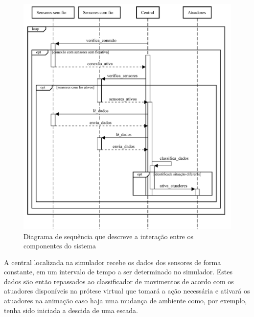 \begin{figure}[ht]
	\caption{\label{fig:sequence_diagram}Diagrama de sequência que descreve a interação entre os componentes do sistema}
	\begin{center}
	    \includegraphics[width=\textwidth]{resources/sequence_diagram.pdf}
	\end{center}
\end{figure}

A central localizada na simulador recebe os dados dos sensores de forma constante, em um intervalo de tempo a ser determinado no simulador. Estes dados são então repassados ao classificador de movimentos de acordo com os atuadores disponíveis na prótese virtual que tomará a ação necessária e ativará os atuadores na animação caso haja uma mudança de ambiente como, por exemplo, tenha sido iniciada a descida de uma escada.

